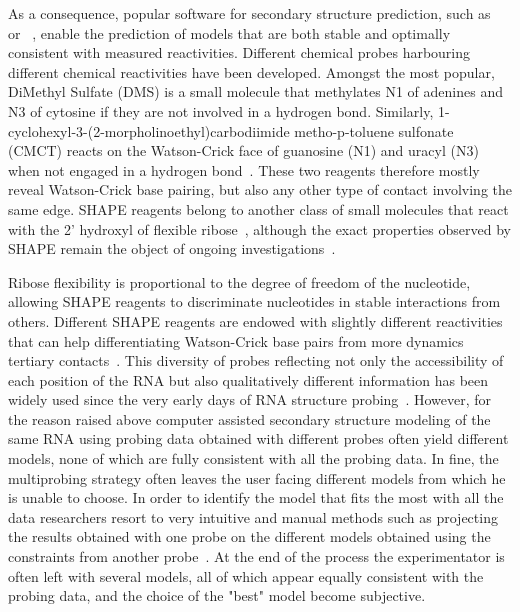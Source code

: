 \documentclass[a4,center,fleqn]{NAR}
\newcommand{\Software}[1]{\text{\ttfamily\bfseries #1}}
\begin{document}
As a consequence, popular software for secondary structure prediction, such as \Software{RNAStructure}~\cite{Mathews2004} or \Software{RNAfold}~\cite{Lorenz2011}, enable the prediction of models that are both stable and optimally consistent with measured reactivities. 
Different chemical probes harbouring different chemical reactivities have been developed. Amongst the most popular, DiMethyl Sulfate (DMS) is a small molecule that methylates N1 of adenines and N3 of cytosine if they are not involved in a hydrogen bond. Similarly, 1-cyclohexyl-3-(2-morpholinoethyl)carbodiimide metho-p-toluene sulfonate (CMCT) reacts on the Watson-Crick face of guanosine (N1) and uracyl (N3) when not engaged in a hydrogen bond~\cite{Ehresmann1987,Brunel2000}. These two reagents therefore mostly reveal Watson-Crick base pairing, but also any other type of contact involving the same edge. SHAPE reagents belong to another class of small molecules that react with the 2’ hydroxyl of flexible ribose~\cite{McGinnis2012}, although the exact properties observed by SHAPE remain the object of ongoing investigations~\cite{Hurst2018,Mlynsky2018,Frezza2019}. 



Ribose flexibility is proportional to the degree of freedom of the nucleotide, allowing SHAPE reagents to discriminate nucleotides in stable interactions from others. Different SHAPE reagents are endowed with slightly different reactivities that can help differentiating Watson-Crick base pairs from more dynamics tertiary contacts~\cite{Gherghe2008,Steen2012}. This diversity of probes reflecting not only the accessibility of each position of the RNA but also qualitatively different information has been widely used since the very early days of RNA structure probing~\cite{Moazed1986, Romaniuk1988, Butcher1994, Brunel2000,  Cordero2015, Somarowthu2015, Gross2017}. However, for the reason raised above computer assisted secondary structure modeling of the same RNA using probing data obtained with different probes often yield different models, none of which are fully consistent with all the probing data. In fine, the multiprobing strategy often leaves the user facing different models from which he is unable to choose. 
In order to identify the model that fits the most with all the data researchers resort to very intuitive and manual methods such as projecting the results obtained with one probe on the different models obtained using the constraints from another probe~\cite{Herbreteau2005,James2008,Weill2004,Othman2014}. At the end of the process the experimentator is often left with several models, all of which appear equally consistent with the probing data, and the choice of the "best" model become subjective. 
\end{document}
